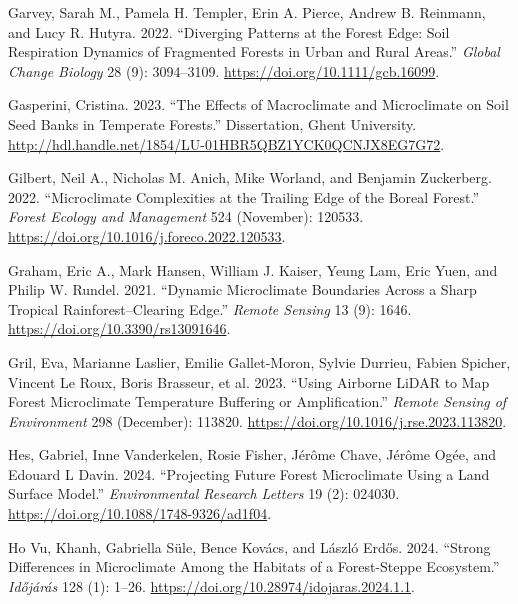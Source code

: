 \documentclass[
  12pt,
]{article}
\newlength{\cslhangindent}
\newenvironment{CSLReferences}[2] %
 {\begin{list}{}{%
  \setlength{\itemindent}{0pt}
  \setlength{\leftmargin}{0pt}
  \setlength{\parsep}{0pt}
  \ifodd #1
   \setlength{\leftmargin}{\cslhangindent}
   \setlength{\itemindent}{-1\cslhangindent}
  \fi
  \setlength{\itemsep}{#2\baselineskip}}}
 {\end{list}}
\begin{document}
\begin{CSLReferences}{1}{0}
Garvey, Sarah M., Pamela H. Templer, Erin A. Pierce, Andrew B. Reinmann,
and Lucy R. Hutyra. 2022. {``Diverging Patterns at the Forest Edge:
{Soil} Respiration Dynamics of Fragmented Forests in Urban and Rural
Areas.''} \emph{Global Change Biology} 28 (9): 3094--3109.
\url{https://doi.org/10.1111/gcb.16099}.

Gasperini, Cristina. 2023. {``The Effects of Macroclimate and
Microclimate on Soil Seed Banks in Temperate Forests.''} Dissertation,
Ghent University.
\url{http://hdl.handle.net/1854/LU-01HBR5QBZ1YCK0QCNJX8EG7G72}.

Gilbert, Neil A., Nicholas M. Anich, Mike Worland, and Benjamin
Zuckerberg. 2022. {``Microclimate Complexities at the Trailing Edge of
the Boreal Forest.''} \emph{Forest Ecology and Management} 524
(November): 120533. \url{https://doi.org/10.1016/j.foreco.2022.120533}.

Graham, Eric A., Mark Hansen, William J. Kaiser, Yeung Lam, Eric Yuen,
and Philip W. Rundel. 2021. {``Dynamic {Microclimate} {Boundaries}
Across a {Sharp} {Tropical} {Rainforest}--{Clearing} {Edge}.''}
\emph{Remote Sensing} 13 (9): 1646.
\url{https://doi.org/10.3390/rs13091646}.

Gril, Eva, Marianne Laslier, Emilie Gallet-Moron, Sylvie Durrieu, Fabien
Spicher, Vincent Le Roux, Boris Brasseur, et al. 2023. {``Using Airborne
{LiDAR} to Map Forest Microclimate Temperature Buffering or
Amplification.''} \emph{Remote Sensing of Environment} 298 (December):
113820. \url{https://doi.org/10.1016/j.rse.2023.113820}.

Hes, Gabriel, Inne Vanderkelen, Rosie Fisher, Jérôme Chave, Jérôme Ogée,
and Edouard L Davin. 2024. {``Projecting Future Forest Microclimate
Using a Land Surface Model.''} \emph{Environmental Research Letters} 19
(2): 024030. \url{https://doi.org/10.1088/1748-9326/ad1f04}.

Ho Vu, Khanh, Gabriella Süle, Bence Kovács, and László Erdős. 2024.
{``Strong Differences in Microclimate Among the Habitats of a
Forest-Steppe Ecosystem.''} \emph{Időjárás} 128 (1): 1--26.
\url{https://doi.org/10.28974/idojaras.2024.1.1}.


\end{CSLReferences}
\end{document}
